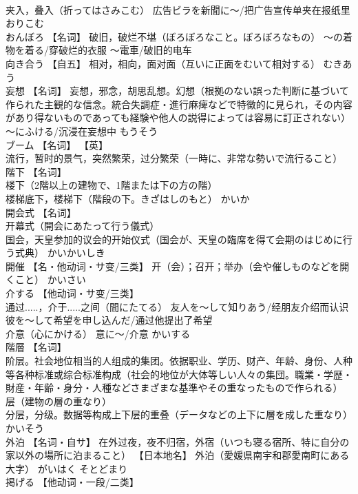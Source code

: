 \documentclass[8pt]{extreport}
\begin{document}
\begin{CJK}{UTF8}{min}
\\	夹入，叠入（折ってはさみこむ） 広告ビラを新聞に～/把广告宣传单夹在报纸里	おりこむ	
\\	おんぼろ	【名词】 破旧，破烂不堪（ぼろぼろなこと。ぼろぼろなもの） ～の着物を着る/穿破烂的衣服 ～電車/破旧的电车		
\\	向き合う	【自五】 相对，相向，面对面（互いに正面をむいて相対する）	むきあう	
\\	妄想	【名词】 妄想，邪念，胡思乱想。幻想（根拠のない誤った判断に基づいて作られた主観的な信念。統合失調症・進行麻痺などで特徴的に見られ，その内容があり得ないものであっても経験や他人の説得によっては容易に訂正されない） 〜にふける/沉浸在妄想中	もうそう	
\\	ブーム	【名词】 【英】
\\	流行，暂时的景气，突然繁荣，过分繁荣（一時に、非常な勢いで流行ること）		
\\	階下	【名词】 
\\	楼下（2階以上の建物で、1階または下の方の階） 
\\	楼梯底下，楼梯下（階段の下。きざはしのもと）	かいか	
\\	開会式	【名词】 
\\	开幕式（開会にあたって行う儀式） 
\\	国会，天皇参加的议会的开始仪式（国会が、天皇の臨席を得て会期のはじめに行う式典）	かいかいしき	
\\	開催	【名・他动词・サ变/三类】 开（会）；召开；举办（会や催しものなどを開くこと）	かいさい	
\\	介する	【他动词・サ变/三类】 
\\	通过.....，介于.....之间（間にたてる） 友人を～して知りあう/经朋友介绍而认识 彼を～して希望を申し込んだ/通过他提出了希望 
\\	介意（心にかける） 意に～/介意	かいする	
\\	階層	【名词】 
\\	阶层。社会地位相当的人组成的集团。依据职业、学历、财产、年龄、身份、人种等各种标准或综合标准构成（社会的地位が大体等しい人々の集団。職業・学歴・財産・年齢・身分・人種などさまざまな基準やその重なったもので作られる） 
\\	层（建物の層の重なり） 
\\	分层，分级。数据等构成上下层的重叠（データなどの上下に層を成した重なり）	かいそう	
\\	外泊	【名词・自サ】 在外过夜，夜不归宿，外宿（いつも寝る宿所、特に自分の家以外の場所に泊まること） 【日本地名】 外泊（愛媛県南宇和郡愛南町にある大字）	がいはく そとどまり	
\\	掲げる	【他动词・一段/二类】 

\end{CJK}
\end{document}
